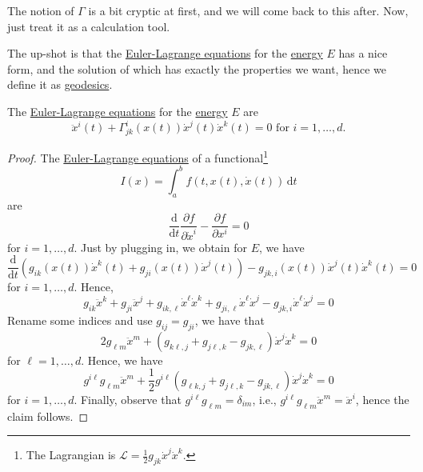 \begin{remark}
	The notion of \(\Gamma \) is a bit cryptic at first, and we will come back to this after. Now, just treat it as a calculation tool.
\end{remark}

The up-shot is that the \href{https://en.wikipedia.org/wiki/Euler%E2%80%93Lagrange_equation}{Euler-Lagrange equations} for the \hyperref[def:energy]{energy} \(E\) has a nice form, and the solution of which has exactly the properties we want, hence we define it as \hyperref[def:geodesic]{geodesics}. 

\begin{proposition}\label{prop:Euler-Lagrange-eq-geodesic}
	The \href{https://en.wikipedia.org/wiki/Euler-Lagrange_equation}{Euler-Lagrange equations} for the \hyperref[def:energy]{energy} \(E\) are
	\begin{equation}\label{eq:geodesic}
		\ddot{x}^i(t) + \Gamma ^{i}_{jk}(x(t)) \dot{x}^j(t)\dot{x}^k(t) = 0 \text{ for } i = 1, \ldots , d.
	\end{equation}
\end{proposition}
\begin{proof}
	The \href{https://en.wikipedia.org/wiki/Euler-Lagrange_equation}{Euler-Lagrange equations} of a functional\footnote{The Lagrangian is \(\mathcal{L} = \frac{1}{2} g_{jk} \dot{x}^j \dot{x} ^k\).}
	\[
		I(x) = \int_{a}^{b} f(t, x(t), \dot{x}(t)) \,\mathrm{d}t
	\]
	are
	\[
		\frac{\mathrm{d}}{\mathrm{d}t} \frac{\partial f}{\partial \dot{x}^i} - \frac{\partial f}{\partial x^i} = 0
	\]
	for \(i = 1, \ldots , d\). Just by plugging in, we obtain for \(E\), we have
	\[
		\frac{\mathrm{d}}{\mathrm{d}t} \left( g_{ik} (x(t)) \dot{x}^k (t) + g_{ji}(x(t))\dot{x}^j(t) \right) - g_{jk, i}(x(t))\dot{x}^j(t)\dot{x}^k(t) = 0
	\]
	for \(i = 1, \ldots , d\). Hence,
	\[
		g_{ik} \ddot{x}^k + g_{ji}\ddot{x}^j + g_{ik, \ell }\dot{x}^{\ell }\dot{x}^k + g_{ji, \ell }\dot{x}^{\ell}\dot{x}^j - g_{jk, i} \dot{x}^{\ell } \dot{x}^j = 0
	\]
	Rename some indices and use \(g_{ij} = g_{ji} \), we have that
	\[
		2g_{\ell m}\ddot{x}^m + \left( g_{k \ell , j}+ g_{j \ell , k} - g_{jk, \ell} \right) \dot{x}^j \dot{x}^k = 0
	\]
	for \(\ell = 1, \ldots , d\). Hence, we have
	\[
		g^{i \ell }g_{\ell m}\ddot{x}^m + \frac{1}{2} g^{i \ell } \left( g_{\ell k, j} + g_{j \ell , k} - g_{jk, \ell } \right) \dot{x}^j \dot{x}^k = 0
	\]
	for \(i = 1, \ldots , d\). Finally, observe that \(g^{i \ell } g_{\ell m} = \delta _{im}\), i.e., \(g^{i \ell } g_{\ell m} \ddot{x}^m = \ddot{x}^i\), hence the claim follows.
\end{proof}

